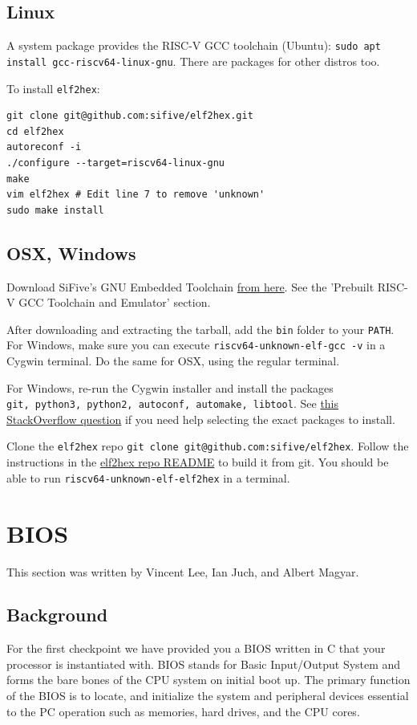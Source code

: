 \documentclass[11pt]{article}
\begin{document}
\subsection{Linux}
A system package provides the RISC-V GCC toolchain (Ubuntu): \verb|sudo apt install gcc-riscv64-linux-gnu|.
There are packages for other distros too.

To install \verb|elf2hex|:
\begin{verbatim}
git clone git@github.com:sifive/elf2hex.git
cd elf2hex
autoreconf -i
./configure --target=riscv64-linux-gnu
make
vim elf2hex # Edit line 7 to remove 'unknown'
sudo make install
\end{verbatim}

\subsection{OSX, Windows}
Download SiFive's GNU Embedded Toolchain \href{https://www.sifive.com/boards}{from here}.
See the 'Prebuilt RISC-V GCC Toolchain and Emulator' section.

After downloading and extracting the tarball, add the \verb|bin| folder to your \verb|PATH|.
For Windows, make sure you can execute \verb|riscv64-unknown-elf-gcc -v| in a Cygwin terminal.
Do the same for OSX, using the regular terminal.

For Windows, re-run the Cygwin installer and install the packages\\\verb|git, python3, python2, autoconf, automake, libtool|.
See \href{https://stackoverflow.com/questions/47168311/cygwin-and-failed-to-run-aclocal-no-such-file-or-directory}{this StackOverflow question} if you need help selecting the exact packages to install.

Clone the \verb|elf2hex| repo \verb|git clone git@github.com:sifive/elf2hex|.
Follow the instructions in the \href{https://github.com/sifive/elf2hex}{elf2hex repo README} to build it from git.
You should be able to run \verb|riscv64-unknown-elf-elf2hex| in a terminal.

\section{BIOS}
\label{sec:biosinfo}
This section was written by Vincent Lee, Ian Juch, and Albert Magyar.

\subsection{Background}
For the first checkpoint we have provided you a BIOS written in C that your processor is
instantiated with. BIOS stands for Basic Input/Output System and forms the bare bones of the
CPU system on initial boot up. The primary function of the BIOS is to locate, and initialize the
system and peripheral devices essential to the PC operation such as memories, hard drives, and
the CPU cores.
\end{document}
